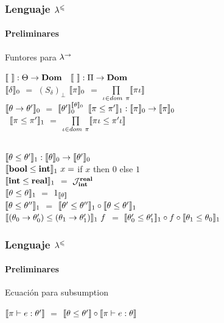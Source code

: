 \documentclass{beamer}
\begin{document}
\begin{frame}
\frametitle{Lenguaje $\lambda^{\leqslant}$}
\framesubtitle{Preliminares}

\begin{block}{Funtores para $\lambda^{\rightarrow}$}

$\llbracket  \  \rrbracket : \Theta \rightarrow \textbf{Dom}$ 
\quad \quad \quad \quad \quad \quad \quad \quad \
$\llbracket  \  \rrbracket : \Pi \rightarrow \textbf{Dom}$ \\

$\llbracket \delta \rrbracket_0$ $=$ $(S_\delta)_\bot$
\quad \quad \quad \quad \quad \quad \quad \quad \quad
$\llbracket \pi \rrbracket_0$ $=$ $\prod\limits_{\iota \in dom \ \pi} \llbracket \pi\iota \rrbracket$\\
$\llbracket \theta \rightarrow \theta' \rrbracket_0$ $=$ $\llbracket \theta' \rrbracket_0^{\llbracket \theta \rrbracket_0}$
\quad \quad \quad \quad \quad \quad \pause
$\llbracket \pi \leq \pi' \rrbracket_1 : \llbracket \pi \rrbracket_0 \rightarrow \llbracket \pi \rrbracket_0$\\
\quad \quad \quad \quad \quad \quad \quad \quad \quad \quad \quad \quad 
\quad \quad \
$\llbracket \pi \leq \pi' \rrbracket_1$ $=$ $\prod\limits_{\iota \in dom \ \pi} \llbracket \pi\iota \leq \pi'\iota \rrbracket$\\

\

$\llbracket \theta \leq \theta' \rrbracket_{1} :
\llbracket \theta \rrbracket_{0} \rightarrow \llbracket \theta' \rrbracket_{0}$\\
$\llbracket \textbf{bool} \leq \textbf{int} \rrbracket_1 \ x =$ if $x$ then $0$ else $1$\\
$\llbracket \textbf{int} \leq \textbf{real} \rrbracket_1$ $=$ $\mathcal{J}_{\textbf{int}}^{\textbf{real}}$ \\
$\llbracket \theta \leq \theta \rrbracket_1$ $=$ $1_{\llbracket \theta \rrbracket}$\\
$\llbracket \theta \leq \theta'' \rrbracket_1$ $=$ $\llbracket \theta' \leq \theta'' \rrbracket_1 \circ \llbracket \theta \leq \theta' \rrbracket_1$\\
$\llbracket (\theta_0 \rightarrow \theta'_0) \leq (\theta_1 \rightarrow \theta'_1) \rrbracket_1 \ f$ 
$=$ $\llbracket \theta'_0 \leq \theta'_1 \rrbracket_1 \circ f \circ \llbracket \theta_1 \leq \theta_0 \rrbracket_1$

\end{block}

\end{frame}

\begin{frame}
\frametitle{Lenguaje $\lambda^{\leqslant}$}
\framesubtitle{Preliminares}

\begin{block}{Ecuación para subsumption}
\begin{center}
$\llbracket \pi \vdash e : \theta' \rrbracket$ $=$ $\llbracket \theta \leq \theta' \rrbracket \circ \llbracket \pi \vdash e : \theta \rrbracket$
\end{center}
\end{block}

\end{frame}
\end{document}

